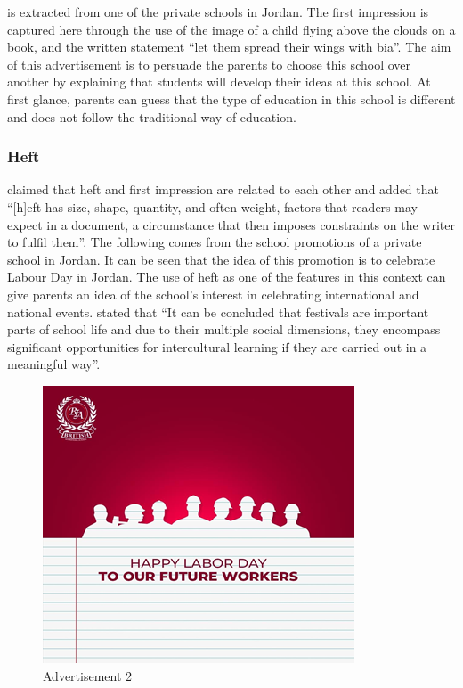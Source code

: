 \documentclass[english]{textolivre}
\begin{document}
 is extracted from one of the private schools in Jordan. The first impression is captured here through the use of the image of a child flying above the clouds on a book, and the written statement “let them spread their wings with bia”. The aim of this advertisement is to persuade the parents to choose this school over another by explaining that students will develop their ideas at this school. At first glance, parents can guess that the type of education in this school is different and does not follow the traditional way of education.

\subsubsection{Heft}\label{sec-organizacao}
\textcite[p.~408]{kumpf_visual_2000} claimed that heft and first impression are related to each other and added that “[h]eft has size, shape, quantity, and often weight, factors that readers may expect in a document, a circumstance that then imposes constraints on the writer to fulfil them”. The following  comes from the school promotions of a private school in Jordan. It can be seen that the idea of this promotion is to celebrate Labour Day in Jordan. The use of heft as one of the features in this context can give parents an idea of the school’s interest in celebrating international and national events. \textcite[p.~268]{niemi_discussing_2014} stated that “It can be concluded that festivals are important parts of school life and due to their multiple social dimensions, they encompass significant opportunities for intercultural learning if they are carried out in a meaningful way”.

\begin{figure}[htbp]
\centering
\begin{minipage}{0.5\textwidth}
\includegraphics[width=\linewidth]{Fig2.png}
\caption{Advertisement 2}
\label{fig2}
\end{minipage}
\end{figure}
\end{document}

